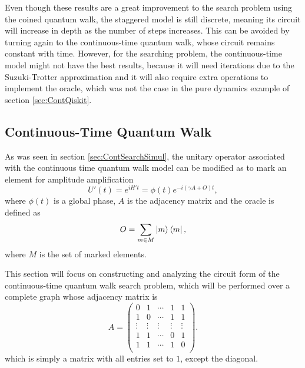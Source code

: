 \documentclass[../../dissertation.tex]{subfiles}
\begin{document}
Even though these results are a great improvement to the search problem using
the coined quantum walk, the staggered model is still discrete, meaning its
circuit will increase in depth as the number of steps increases. This can be
avoided by turning again to the continuous-time quantum walk, whose circuit
remains constant with time.  However, for the searching problem, the
continuous-time model might not have the best results, because it will need
iterations due to the Suzuki-Trotter approximation and it will also require
extra operations to implement the oracle, which was not the case in the pure
dynamics example of section \ref{sec:ContQiskit}.

\subsection{Continuous-Time Quantum Walk}
As was seen in section \ref{sec:ContSearchSimul}, the unitary operator
associated with the continuous time quantum walk model can be modified as to
mark an element for amplitude amplification
\begin{equation}
	U'(t) = e^{iH't} = \phi(t)e^{-i(\gamma A+O)t},
	\label{eq:qiskitU'}
\end{equation}
where $\phi(t)$ is a global phase, $A$ is the adjacency matrix and the oracle
is defined as 
\begin{equation}
	O = \sum_{m \in M} \ket{m}\bra{m},
\end{equation}
where $M$ is the set of marked elements.\par

This section will focus on constructing and analyzing the circuit form of the
continuous-time quantum walk search problem, which will be performed over a
complete graph whose adjacency matrix is
\begin{equation}
  A = 	\begin{pmatrix}
	  0 & 1 &  \cdots & 1 & 1\\
	  1 & 0 & \cdots & 1 & 1\\
	   \vdots & \vdots  & \vdots & \vdots& \vdots\\
	  1 & 1 & \cdots & 0 & 1\\ 
	  1 & 1 & \cdots & 1 & 0\\ 
	\end{pmatrix}.
\end{equation}
which is simply a matrix with all entries set to $1$, except the diagonal.\par
\end{document}
